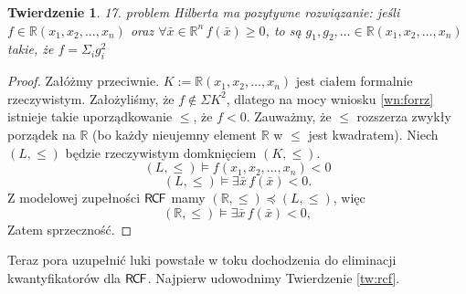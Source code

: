 \documentclass{article}
\newcommand{\R}{\mathbb{R}}
\theoremstyle{plain}
\newtheorem{tw}[thm]{Twierdzenie}
\theoremstyle{definition}
\theoremstyle{remark}
\newcommand{\RCF}{\mathsf{R \mkern-1.7mu C \mkern-1.4mu F}}
\begin{document}
\begin{tw}
	 17. problem Hilberta ma pozytywne rozwiązanie:
	 jeśli $f \in \R(x_1, x_2, \ldots, x_n)$ oraz $\forall \bar{x} \in \R^n \, f(\bar{x}) \geq 0$,
	 to są $g_1, g_2, \ldots \in \R(x_1, x_2, \ldots, x_n)$ takie, że $f = \Sigma_i g_i^2$
\end{tw}
\begin{proof}
	 Załóżmy przeciwnie.
	 $K := \R(x_1, x_2, \ldots, x_n) $ jest ciałem formalnie rzeczywistym.
	 Założyliśmy, że $f \not \in \Sigma K^2$, dlatego na mocy wniosku \ref{wn:forrz} istnieje takie uporządkowanie $\leq$,
	 że $f < 0$.
	 Zauważmy, że $\leq$ rozszerza zwykły porządek na $\R$ (bo każdy nieujemny element $\R$ w $\leq$ jest kwadratem).
	 Niech $(L, \leq)$ będzie rzeczywistym domknięciem $(K, \leq)$.
	 \[
	 	 (L, \leq) \models f(x_1, x_2, \ldots, x_n ) < 0
	 \]
	 \[
	 	 (L, \leq) \models \exists \bar{x}  \, f(\bar{x}) < 0.
	 \]
	 Z modelowej zupełności $\RCF$ mamy $(\R, \leq) \preccurlyeq (L, \leq)$, więc
	 \[
	 	 (\R, \leq) \models  \exists \bar{x}  \, f(\bar{x}) < 0,
	 \]
Zatem sprzeczność.
\end{proof}


Teraz pora uzupełnić luki powstałe w toku dochodzenia do eliminacji
kwantyfikatorów dla $\RCF$. Najpierw udowodnimy Twierdzenie \ref{tw:rcf}.
\end{document}
